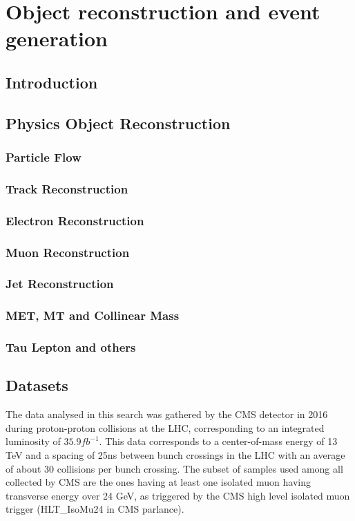 
%
%

\chapter{Object reconstruction and event generation}
\label{chap:event_sim}


\section{Introduction}
\label{intro}

\section{Physics Object Reconstruction}
\label{p_ob_recon}

\subsection{Particle Flow}
\label{p_flow}
\subsection{Track Reconstruction}
\label{track_recon}
\subsection{Electron Reconstruction}
\label{e_recon}
\subsection{Muon Reconstruction}
\label{mu_recon}
\subsection{Jet Reconstruction}
\label{jet_recon}
\subsection{MET, MT and Collinear Mass}
\label{col_mass}
\subsection{Tau Lepton and others}
\label{tau_recon}
\section{Datasets}
\label{datasets}

The data analysed in this search was gathered by the CMS detector in 2016 during proton-proton collisions at the LHC, corresponding to an integrated luminosity of $35.9 fb^{-1}$. This data corresponds to a center-of-mass energy of 13 TeV and a spacing of 25ns between bunch crossings in the LHC with an average of about 30 collisions per bunch crossing. The subset of samples used among all collected by CMS are the ones having at least one isolated muon having transverse energy over 24 GeV, as triggered by the CMS high level isolated muon trigger (HLT\_IsoMu24 in CMS parlance).

